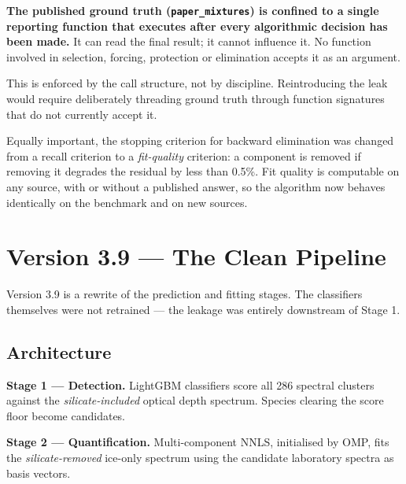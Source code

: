 \documentclass[11pt,a4paper]{article}
\newcommand{\code}[1]{\texttt{\small #1}}
\begin{document}
\begin{goodbox}
\textbf{The published ground truth (\code{paper\_mixtures}) is confined to
a single reporting function that executes after every algorithmic decision
has been made.} It can read the final result; it cannot influence it. No
function involved in selection, forcing, protection or elimination accepts
it as an argument.

\vspace{4pt}
This is enforced by the call structure, not by discipline. Reintroducing
the leak would require deliberately threading ground truth through function
signatures that do not currently accept it.
\end{goodbox}

Equally important, the stopping criterion for backward elimination was
changed from a recall criterion to a \emph{fit-quality} criterion: a
component is removed if removing it degrades the residual by less than
0.5\%. Fit quality is computable on any source, with or without a published
answer, so the algorithm now behaves identically on the benchmark and on
new sources.

\section{Version 3.9 --- The Clean Pipeline}

Version 3.9 is a rewrite of the prediction and fitting stages. The
classifiers themselves were not retrained --- the leakage was entirely
downstream of Stage 1.

\subsection{Architecture}

\begin{keybox}
\textbf{Stage 1 --- Detection.} LightGBM classifiers score all 286 spectral
clusters against the \emph{silicate-included} optical depth spectrum.
Species clearing the score floor become candidates.

\vspace{6pt}
\textbf{Stage 2 --- Quantification.} Multi-component NNLS, initialised by
OMP, fits the \emph{silicate-removed} ice-only spectrum using the candidate
laboratory spectra as basis vectors.
\end{keybox}
\end{document}
